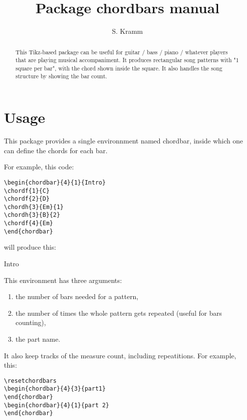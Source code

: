 \documentclass[11pt]{article}
\title{Package chordbars manual}
\author{S. Kramm}
\begin{document}
\maketitle

\begin{abstract}
This Tikz-based package can be useful for guitar / bass / piano / whatever players that are playing musical accompaniment.
It produces rectangular song patterns with "1 square per bar", with the chord shown inside the square.
It also handles the song structure by showing the bar count.
\end{abstract}

\section{Usage}
This package provides a single environnment named {\ttfamily chordbar}, inside which one can define the chords for each bar.

For example, this code:

\begin{lstlisting}
\begin{chordbar}{4}{1}{Intro}
\chordf{1}{C}
\chordf{2}{D}
\chordh{3}{Em}{1}
\chordh{3}{B}{2}
\chordf{4}{Em}
\end{chordbar}
\end{lstlisting}

will produce this:

\begin{chordbar}{4}{1}{Intro}
\end{chordbar}


This environment has three arguments:
\begin{enumerate}
\item the number of bars needed for a pattern,
\item the number of times the whole pattern gets repeated (useful for bars counting),
\item the part name.
\end{enumerate}

It also keep tracks of the measure count, including repeatitions. For example, this:

\begin{lstlisting}
\resetchordbars
\begin{chordbar}{4}{3}{part1}
\end{chordbar}
\begin{chordbar}{4}{1}{part 2}
\end{chordbar}
\end{lstlisting}
\end{document}
